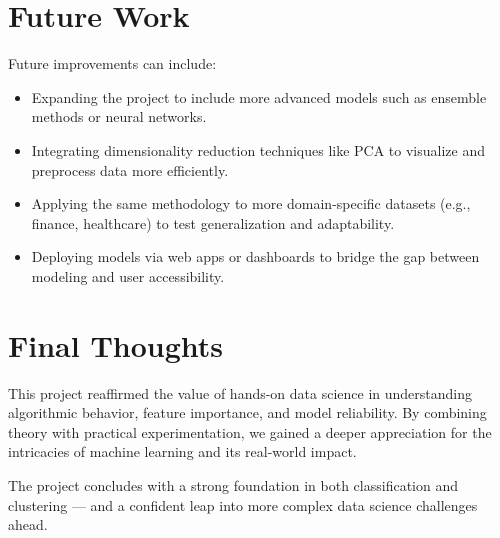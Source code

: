 \section{Future Work}

Future improvements can include:
\begin{itemize}
    \item Expanding the project to include more advanced models such as ensemble methods or neural networks.
    \item Integrating dimensionality reduction techniques like PCA to visualize and preprocess data more efficiently.
    \item Applying the same methodology to more domain-specific datasets (e.g., finance, healthcare) to test generalization and adaptability.
    \item Deploying models via web apps or dashboards to bridge the gap between modeling and user accessibility.
\end{itemize}

\section{Final Thoughts}

This project reaffirmed the value of hands-on data science in understanding algorithmic behavior, feature importance, and model reliability. By combining theory with practical experimentation, we gained a deeper appreciation for the intricacies of machine learning and its real-world impact.

The project concludes with a strong foundation in both classification and clustering — and a confident leap into more complex data science challenges ahead.